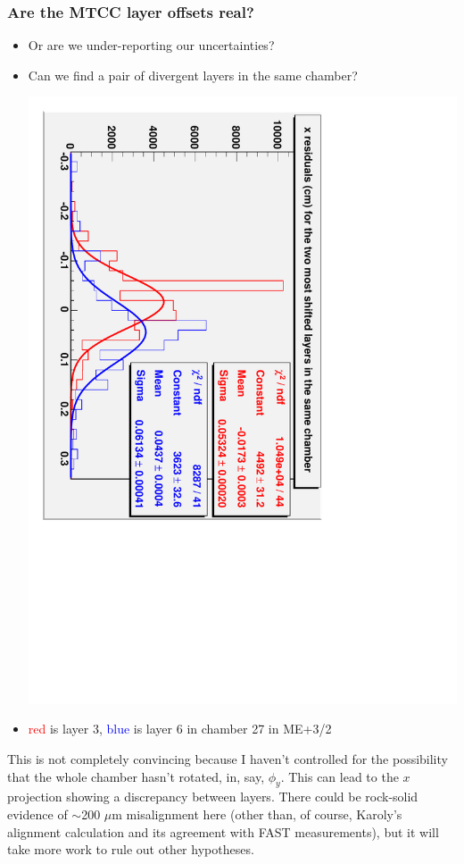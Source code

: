 \documentclass[compress]{beamer}
\begin{document}
\begin{frame}
\frametitle{Are the MTCC layer offsets real?}
\begin{itemize}
\item Or are we under-reporting our uncertainties?
\item Can we find a pair of divergent layers in the same chamber?
\begin{center}
\includegraphics[height=0.7\linewidth, angle=90]{realplots/extremum}
\end{center}
\item \textcolor{red}{red} is layer 3, \textcolor{blue}{blue} is layer 6 in chamber 27 in ME+3/2
\end{itemize}
\end{frame}

\begin{notes}
\item This is not completely convincing because I haven't controlled
for the possibility that the whole chamber hasn't rotated, in, say,
$\phi_y$.  This can lead to the $x$ projection showing a discrepancy
between layers.  There could be rock-solid evidence of $\sim$200
$\mu$m misalignment here (other than, of course, Karoly's alignment
calculation and its agreement with FAST measurements), but it will
take more work to rule out other hypotheses.
\end{notes}
\end{document}
